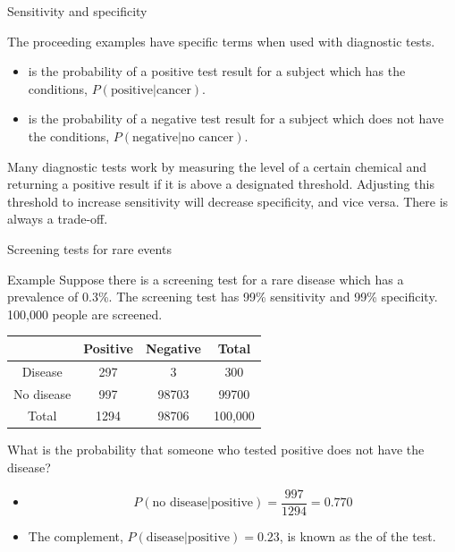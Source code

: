 \documentclass[xcolor=table]{beamer}
\begin{document}
\begin{frame}{Sensitivity and specificity}
\begin{block}{}
The proceeding examples have specific terms when used with diagnostic tests.
\begin{itemize}
\pause
\item {} is the probability of a positive test result for a subject which has the conditions, $P(\text{positive}|\text{cancer})$.
\pause
\item {} is the probability of a negative test result for a subject which does not have the conditions, $P(\text{negative}|\text{no cancer})$.
\end{itemize}

\pause
Many diagnostic tests work by measuring the level of a certain chemical and returning a positive result if it is above a designated threshold. Adjusting this threshold to increase sensitivity will decrease specificity, and vice versa. There is always a trade-off.
\end{block}
\end{frame}

\begin{frame}{Screening tests for rare events}
\begin{exampleblock}{Example}
Suppose there is a screening test for a rare disease which has a prevalence of 0.3\%. The screening test has 99\% sensitivity and 99\% specificity. 100,000 people are screened.\\
\smallskip
{\centering \renewcommand{\arraystretch}{1}
\begin{tabular}{c | c  c | c}
 & Positive & Negative & Total \\
\hline
Disease & 297 & 3 & 300\\
No disease & 997 & 98703 & 99700\\
\hline
Total & 1294 & 98706 & 100,000 
\end{tabular}\par
\renewcommand{\arraystretch}{1.5}
}
\smallskip
What is the probability that someone who tested positive does not have the disease?
\begin{itemize}
\pause
\item \[P(\text{no disease} | \text{positive}) = \frac {997}{1294} = 0.770\]
\vspace*{-\baselineskip}\pause
\item The complement, $P(\text{disease} | \text{positive}) = 0.23$, is known as the  of the test.
\end{itemize}

\end{exampleblock}
\end{frame}
\end{document}
